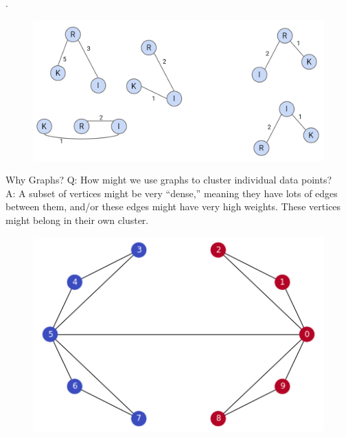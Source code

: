 \documentclass[aspectratio=169]{../latex_main/tntbeamer}  %
\begin{document}
	
	\begin{frame}{.}
	    \begin{figure}
	        \centering
	        \includegraphics[scale=.35]{Bild8}
	    \end{figure}
	\end{frame}
	
	
	\begin{frame}{Why Graphs?}
	    Q: How might we use graphs to cluster individual data points?\\
	    A: A subset of vertices might be very “dense,” meaning they have lots of edges between them, and/or these edges might have very high weights. These vertices might belong in their own cluster.
	    \begin{figure}
	        \centering
	        \includegraphics[scale=.65]{Bild9}
	    \end{figure}
	\end{frame}
	
\end{document}
